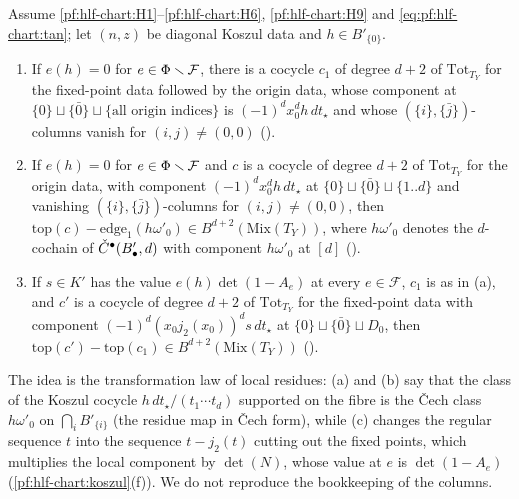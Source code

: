 \begin{lemma}\label{pf:hlf-chart:ybig}
Assume \ref{pf:hlf-chart:H1}--\ref{pf:hlf-chart:H6}, \ref{pf:hlf-chart:H9} and \eqref{eq:pf:hlf-chart:tan}; let $(n,z)$ be diagonal Koszul data and
$h\in B'_{\{0\}}$.
\begin{enumerate}[label=\textup{(\alph*)},nosep]
\item If $e(h)=0$ for $e\in\Phi\smallsetminus\mathcal F$, there is a cocycle $c_1$ of degree $d+2$ of $\mathrm{Tot}_{T_Y}$ for the fixed-point data
followed by the origin data, whose component at $\{0\}\sqcup\{\bar0\}\sqcup\{\text{all origin indices}\}$ is $(-1)^dx_0^dh\,dt_\star$ and whose
$(\{i\},\{\bar j\})$-columns vanish for $(i,j)\ne(0,0)$ \textup{()}.
\item If $e(h)=0$ for $e\in\Phi\smallsetminus\mathcal F$ and $c$ is a cocycle of degree $d+2$ of $\mathrm{Tot}_{T_Y}$ for the origin data, with component
$(-1)^dx_0^dh\,dt_\star$ at $\{0\}\sqcup\{\bar0\}\sqcup\{1..d\}$ and vanishing $(\{i\},\{\bar j\})$-columns for $(i,j)\ne(0,0)$, then
$\mathrm{top}(c)-\mathrm{edge}_1(h\omega'_0)\in B^{d+2}(\mathrm{Mix}(T_Y))$, where $h\omega'_0$ denotes the $d$-cochain of $\check{C}^\bullet(B'_\bullet,d)$ with
component $h\omega'_0$ at $[d]$ \textup{()}.
\item If $s\in K'$ has the value $e(h)\det(1-A_e)$ at every $e\in\mathcal F$, $c_1$ is as in \textup{(a)}, and $c'$ is a cocycle of degree $d+2$ of
$\mathrm{Tot}_{T_Y}$ for the fixed-point data with component $(-1)^d(x_0j_2(x_0))^ds\,dt_\star$ at $\{0\}\sqcup\{\bar0\}\sqcup D_0$, then
$\mathrm{top}(c')-\mathrm{top}(c_1)\in B^{d+2}(\mathrm{Mix}(T_Y))$ \textup{()}.
\end{enumerate}
\end{lemma}

The idea is the transformation law of local residues: (a) and (b) say that the class of the Koszul cocycle
$h\,dt_\star/(t_1\cdots t_d)$ supported on the fibre is the \v{C}ech class $h\omega'_0$ on $\bigcap_iB'_{\{i\}}$ (the residue map in \v{C}ech form), while
(c) changes the regular sequence $t$ into the sequence $t-j_2(t)$ cutting out the fixed points, which multiplies the local component by
$\det(N)$, whose value at $e$ is $\det(1-A_e)$ (\cref{pf:hlf-chart:koszul}(f)). We do not reproduce the bookkeeping of the columns.

